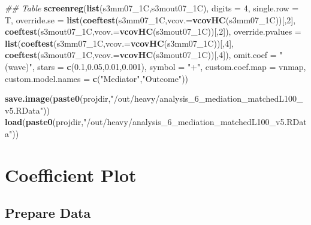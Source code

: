 \documentclass[
]{article}
\newenvironment{Shaded}{\begin{snugshade}}{\end{snugshade}}
\newcommand{\CommentTok}[1]{\textcolor[rgb]{0.56,0.35,0.01}{\textit{#1}}}
\newcommand{\DataTypeTok}[1]{\textcolor[rgb]{0.13,0.29,0.53}{#1}}
\newcommand{\DecValTok}[1]{\textcolor[rgb]{0.00,0.00,0.81}{#1}}
\newcommand{\FloatTok}[1]{\textcolor[rgb]{0.00,0.00,0.81}{#1}}
\newcommand{\KeywordTok}[1]{\textcolor[rgb]{0.13,0.29,0.53}{\textbf{#1}}}
\newcommand{\NormalTok}[1]{#1}
\newcommand{\StringTok}[1]{\textcolor[rgb]{0.31,0.60,0.02}{#1}}
\begin{document}
\begin{Shaded}
\begin{Highlighting}[]
\CommentTok{## Table}
\KeywordTok{screenreg}\NormalTok{(}\KeywordTok{list}\NormalTok{(s3mm07_1C,s3mout07_1C), }\DataTypeTok{digits =} \DecValTok{4}\NormalTok{, }\DataTypeTok{single.row =}\NormalTok{ T,}
          \DataTypeTok{override.se =} \KeywordTok{list}\NormalTok{(}\KeywordTok{coeftest}\NormalTok{(s3mm07_1C,}\DataTypeTok{vcov.=}\KeywordTok{vcovHC}\NormalTok{(s3mm07_1C))[,}\DecValTok{2}\NormalTok{],}
                             \KeywordTok{coeftest}\NormalTok{(s3mout07_1C,}\DataTypeTok{vcov.=}\KeywordTok{vcovHC}\NormalTok{(s3mout07_1C))[,}\DecValTok{2}\NormalTok{]),}
          \DataTypeTok{override.pvalues =} \KeywordTok{list}\NormalTok{(}\KeywordTok{coeftest}\NormalTok{(s3mm07_1C,}\DataTypeTok{vcov.=}\KeywordTok{vcovHC}\NormalTok{(s3mm07_1C))[,}\DecValTok{4}\NormalTok{],}
                                  \KeywordTok{coeftest}\NormalTok{(s3mout07_1C,}\DataTypeTok{vcov.=}\KeywordTok{vcovHC}\NormalTok{(s3mout07_1C))[,}\DecValTok{4}\NormalTok{]),}
          \DataTypeTok{omit.coef =} \StringTok{"(wave)"}\NormalTok{, }\DataTypeTok{stars =} \KeywordTok{c}\NormalTok{(}\FloatTok{0.1}\NormalTok{,}\FloatTok{0.05}\NormalTok{,}\FloatTok{0.01}\NormalTok{,}\FloatTok{0.001}\NormalTok{), }\DataTypeTok{symbol =} \StringTok{"+"}\NormalTok{,}
          \DataTypeTok{custom.coef.map =}\NormalTok{ vnmap, }
          \DataTypeTok{custom.model.names =} \KeywordTok{c}\NormalTok{(}\StringTok{"Mediator"}\NormalTok{,}\StringTok{"Outcome"}\NormalTok{))}
\end{Highlighting}
\end{Shaded}

\begin{Shaded}
\begin{Highlighting}[]
\KeywordTok{save.image}\NormalTok{(}\KeywordTok{paste0}\NormalTok{(projdir,}\StringTok{"/out/heavy/analysis_6_mediation_matchedL100_v5.RData"}\NormalTok{))}
\KeywordTok{load}\NormalTok{(}\KeywordTok{paste0}\NormalTok{(projdir,}\StringTok{"/out/heavy/analysis_6_mediation_matchedL100_v5.RData"}\NormalTok{))}
\end{Highlighting}
\end{Shaded}

\hypertarget{coefficient-plot}{%
\section{Coefficient Plot}\label{coefficient-plot}}

\hypertarget{prepare-data}{%
\subsection{Prepare Data}\label{prepare-data}}
\end{document}
